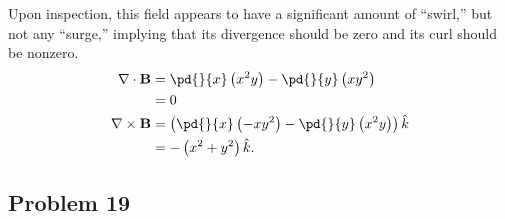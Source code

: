 \documentclass[10pt]{mypackage}
\begin{document}
\begin{enumerate}[(a)]
\begin{center}
    \end{center}
    Upon inspection, this field appears to have a significant amount of ``swirl,'' but not any ``surge,'' implying that its divergence should be zero and its curl should be nonzero.
    \begin{align*}
      \nabla \cdot \mathbf{B} &= \pd{}{x}\left(x^2 y\right) - \pd{}{y}\left(xy^2\right)\\
                              &= 0\\
      \nabla \times \mathbf{B} &= \left(\pd{}{x}\left(-xy^2\right) - \pd{}{y}\left(x^2y\right)\right)\hat{k}\\
                               &= -\left(x^2 + y^2\right)\hat{k}.
    \end{align*}
\end{enumerate}
\subsection{Problem 19}%
\end{document}
